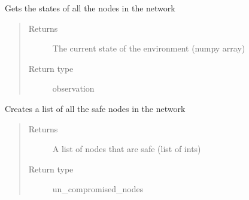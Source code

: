 \documentclass[letterpaper,10pt,english]{sphinxmanual}
\begin{document}
\begin{fulllineitems}

\begin{fulllineitems}
\label{\detokenize{source/yawning_titan.envs.specific.core:yawning_titan.envs.specific.core.nsa_node_collection.NodeCollection.get_observation}}
\sphinxAtStartPar
Gets the states of all the nodes in the network
\begin{quote}\begin{description}
\item[{Returns}] \leavevmode
\sphinxAtStartPar
The current state of the environment (numpy array)

\item[{Return type}] \leavevmode
\sphinxAtStartPar
observation

\end{description}\end{quote}

\end{fulllineitems}


\begin{fulllineitems}
\label{\detokenize{source/yawning_titan.envs.specific.core:yawning_titan.envs.specific.core.nsa_node_collection.NodeCollection.get_un_compromised_nodes}}
\sphinxAtStartPar
Creates a list of all the safe nodes in the network
\begin{quote}\begin{description}
\item[{Returns}] \leavevmode
\sphinxAtStartPar
A list of nodes that are safe (list of ints)

\item[{Return type}] \leavevmode
\sphinxAtStartPar
un\_compromised\_nodes

\end{description}\end{quote}


\end{fulllineitems}
\end{fulllineitems}
\end{document}
